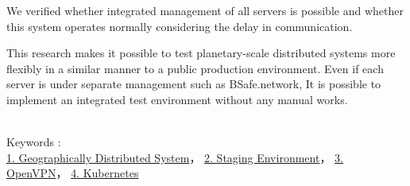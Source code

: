 We verified whether integrated management of all servers is possible and whether this system operates normally considering the delay in communication.

This research makes it possible to test planetary-scale distributed systems more flexibly in a similar manner to a public production environment.
Even if each server is under separate management such as BSafe.network,
It is possible to implement an integrated test environment without any manual works.

~ \\
Keywords : \\
\underline{1. Geographically Distributed System}，
\underline{2. Staging Environment}，
\underline{3. OpenVPN}，
\underline{4. Kubernetes}
\begin{flushright}
\edept \\
\eauthor
\end{flushright}
